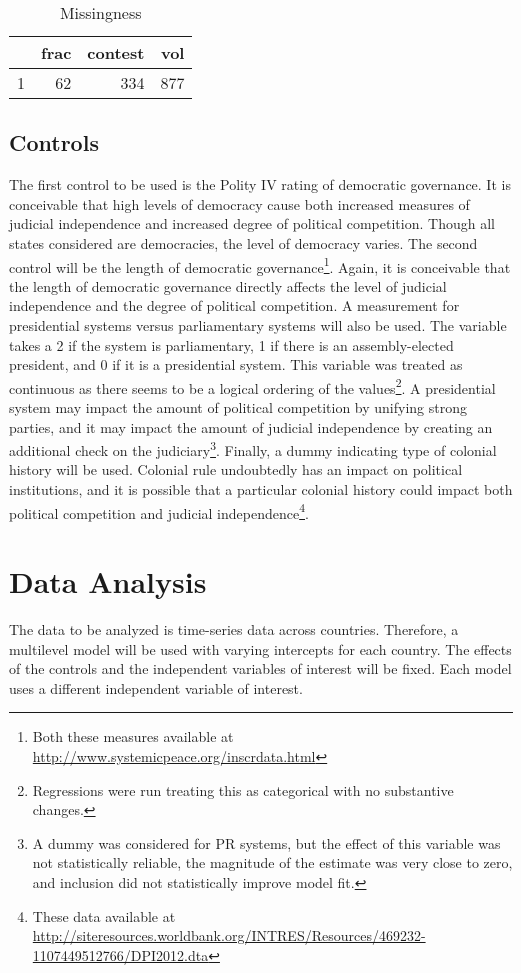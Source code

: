 \documentclass[12pt]{article}
\begin{document}
\begin{table}[ht]
\centering
\begin{tabular}{rrrr}
  \hline
 & frac & contest & vol \\ 
  \hline
1 &  62 & 334 & 877 \\ 
   \hline
\end{tabular}
\caption{Missingness} 
\end{table}


\subsection*{Controls}
The first control to be used is the Polity IV rating of democratic governance. It is conceivable that high levels of democracy cause both increased measures of judicial independence and increased degree of political competition. Though all states considered are democracies, the level of democracy varies. The second control will be the length of democratic governance\footnote{Both these measures available at \url{http://www.systemicpeace.org/inscrdata.html}}. Again, it is conceivable that the length of democratic governance directly affects the level of judicial independence and the degree of political competition. A measurement for presidential systems versus parliamentary systems will  also be used. The variable takes a 2 if the system is parliamentary, 1 if there is an assembly-elected president, and 0 if it is a presidential system. This variable was treated as continuous as there seems to be a logical ordering of the values\footnote{Regressions were run treating this as categorical with no substantive changes.}. A presidential system may impact the amount of political competition by unifying strong parties, and it may impact the amount of judicial independence by creating an additional check on the judiciary\footnote{A dummy was considered for PR systems, but the effect of this variable was not statistically reliable, the magnitude of the estimate was very close to zero, and inclusion did not statistically improve model fit.}. Finally, a dummy indicating type of colonial history will be used. Colonial rule undoubtedly has an impact on political institutions, and it is possible that a particular colonial history could impact both political competition and judicial independence\footnote{These data available at \url{http://siteresources.worldbank.org/INTRES/Resources/469232-1107449512766/DPI2012.dta}}.


\section*{Data Analysis}
The data to be analyzed is time-series data across countries. Therefore, a multilevel model will be used with varying intercepts for each country. The effects of the controls and the independent variables of interest will be fixed. Each model uses a different independent variable of interest. 
\end{document}
